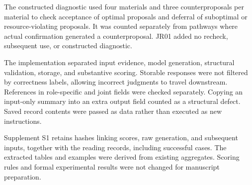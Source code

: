 \documentclass[10pt,a4paper]{article}
\begin{document}
The constructed diagnostic used four materials and three counterproposals per material to check acceptance of optimal proposals and deferral of suboptimal or resource-violating proposals. It was counted separately from pathways where actual confirmation generated a counterproposal. JR01 added no recheck, subsequent use, or constructed diagnostic.

The implementation separated input evidence, model generation, structural validation, storage, and substantive scoring. Storable responses were not filtered by correctness labels, allowing incorrect judgments to travel downstream. References in role-specific and joint fields were checked separately. Copying an input-only summary into an extra output field counted as a structural defect. Saved record contents were passed as data rather than executed as new instructions.

Supplement S1 retains hashes linking scores, raw generation, and subsequent inputs, together with the reading records, including successful cases. The extracted tables and examples were derived from existing aggregates. Scoring rules and formal experimental results were not changed for manuscript preparation.
\end{document}
